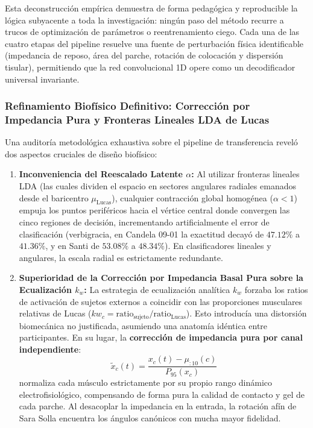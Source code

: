\documentclass[11pt,a4paper,openany]{book}
\theoremstyle{definition}
\begin{document}
Esta deconstrucción empírica demuestra de forma pedagógica y reproducible la lógica subyacente a toda la investigación: ningún paso del método recurre a trucos de optimización de parámetros o reentrenamiento ciego. Cada una de las cuatro etapas del pipeline resuelve una fuente de perturbación física identificable (impedancia de reposo, área del parche, rotación de colocación y dispersión tisular), permitiendo que la red convolucional 1D opere como un decodificador universal invariante.

\subsubsection{Refinamiento Biofísico Definitivo: Corrección por Impedancia Pura y Fronteras Lineales LDA de Lucas}
\label{subsubsec:refinamiento_impedancia_pura_lda}

Una auditoría metodológica exhaustiva sobre el pipeline de transferencia reveló dos aspectos cruciales de diseño biofísico:
\begin{enumerate}
    \item \textbf{Inconveniencia del Reescalado Latente $\alpha$:} Al utilizar fronteras lineales LDA (las cuales dividen el espacio en sectores angulares radiales emanados desde el baricentro $\mu_{\text{Lucas}}$), cualquier contracción global homogénea ($\alpha < 1$) empuja los puntos periféricos hacia el vértice central donde convergen las cinco regiones de decisión, incrementando artificialmente el error de clasificación (verbigracia, en Candela 09-01 la exactitud decayó de $47.12\%$ a $41.36\%$, y en Santi de $53.08\%$ a $48.34\%$). En clasificadores lineales y angulares, la escala radial es estrictamente redundante.
    \item \textbf{Superioridad de la Corrección por Impedancia Basal Pura sobre la Ecualización $k_w$:} La estrategia de ecualización analítica $k_w$ forzaba los ratios de activación de sujetos externos a coincidir con las proporciones musculares relativas de Lucas ($kw_c = \text{ratio}_{\text{sujeto}} / \text{ratio}_{\text{Lucas}}$). Esto introducía una distorsión biomecánica no justificada, asumiendo una anatomía idéntica entre participantes. En su lugar, la \textbf{corrección de impedancia pura por canal independiente}:
    \begin{equation}
        \tilde{x}_c(t) = \frac{x_c(t) - \mu_{:10}(c)}{P_{95}(x_c)}
    \end{equation}
    normaliza cada músculo estrictamente por su propio rango dinámico electrofisiológico, compensando de forma pura la calidad de contacto y gel de cada parche. Al desacoplar la impedancia en la entrada, la rotación afín de Sara Solla encuentra los ángulos canónicos con mucha mayor fidelidad.
\end{enumerate}
\end{document}
